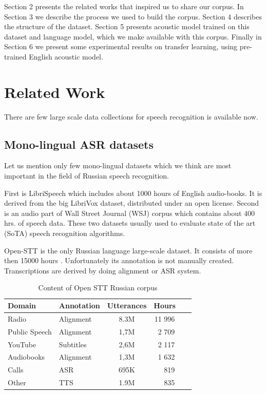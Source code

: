 \documentclass[a4paper]{article}
\begin{document}
Section 2 presents the related works that inspired us to share our corpus. In Section 3 we describe the process we used to build the corpus. Section 4 describes the structure of the dataset. Section 5 presents acoustic model trained on this dataset and language model, which we make available with this corpus. Finally in Section 6 we present some experimental results on transfer learning, using pre-trained English acoustic model.

\section{Related Work}

There are few large scale data collections for speech recognition is available now. 

\subsection{Mono-lingual ASR datasets}

Let us mention only few mono-lingual datasets which we think are most important in the field of Russian speech recognition.

First is LibriSpeech  \cite{panayotov2015librispeech} which  includes about 1000 hours of English audio-books. It is derived from the big LibriVox dataset,  distributed under an open license. Second is an audio part of Wall Street Journal (WSJ) corpus \cite{paul1992design} which contains about 400 hrs. of speech data. These two datasets usually used to evaluate state of the art (SoTA) speech recognition algorithms.

Open-STT is the only Russian language large-scale dataset. It consists of more then 15000 hours \cite{veysov2020towardimagenetstt}. Unfortunately its annotation is not manually created. Transcriptions are derived by doing  alignment or ASR system. 

\begin{table}[th]
  \caption{Content of Open STT Russian corpus}
  \label{tab:openstt}
  \centering
  \begin{tabular}{ llcr }
    \toprule
    Domain & Annotation & Utterances & Hours~~~  \\
    \midrule
    Radio &     Alignment & 8.3M & 11 996 ~~~  \\
    Public Speech & Alignment  & 1,7M & 2 709 ~~~ \\
    YouTube & Subtitles  & 2,6M & 2 117 ~~~ \\
    Audiobooks & Alignment  & 1,3M & 1 632 ~~~ \\
    Calls & ASR  & 695K & 819 ~~~ \\
    Other & TTS  & 1.9M & 835 ~~~ \\
    \bottomrule
  \end{tabular}
\end{table}
\end{document}
